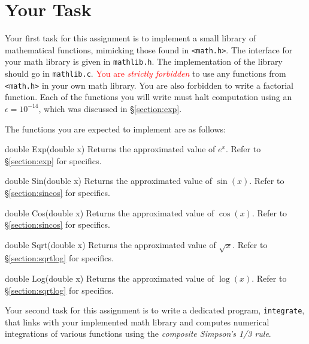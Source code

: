 \section{Your Task}\label{section:task}

Your first task for this assignment is to implement a small library of
mathematical functions, mimicking those found in \texttt{<math.h>}. The
interface for your math library is given in \texttt{mathlib.h}. The
implementation of the library should go in \texttt{mathlib.c}.
\textcolor{red}{You are \emph{strictly forbidden}} to use any functions from
\texttt{<math.h>} in your own math library. You are also forbidden to write a
factorial function. Each of the functions you will write must halt computation
using an $\epsilon = 10^{-14}$, which was discussed in \S\ref{section:exp}.

The functions you are expected to implement are as follows:

\begin{funcdoc}{double Exp(double x)}
  Returns the approximated value of $e^x$. Refer to \S\ref{section:exp}
  for specifics.
\end{funcdoc}

\begin{funcdoc}{double Sin(double x)}
  Returns the approximated value of $\sin(x)$. Refer to
  \S\ref{section:sincos} for specifics.
\end{funcdoc}

\begin{funcdoc}{double Cos(double x)}
  Returns the approximated value of $\cos(x)$. Refer to
  \S\ref{section:sincos} for specifics.
\end{funcdoc}

\begin{funcdoc}{double Sqrt(double x)}
  Returns the approximated value of $\sqrt{x}$. Refer to
  \S\ref{section:sqrtlog} for specifics.
\end{funcdoc}

\begin{funcdoc}{double Log(double x)}
  Returns the approximated value of $\log(x)$. Refer to
  \S\ref{section:sqrtlog} for specifics.
\end{funcdoc}

\vspace{0.5em}
Your second task for this assignment is to write a dedicated program,
\texttt{integrate}, that links with your implemented math library and computes
numerical integrations of various functions using the \emph{composite Simpson's
1/3 rule}.

